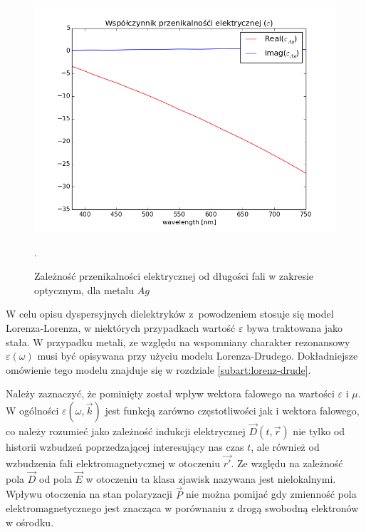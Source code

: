 \begin{figure}[tb]
	\includegraphics[width=\textwidth]{images/agtio2eps.png}
	\label{fig:agtio2eps}
	\caption{Zależność przenikalności elektrycznej od długości fali w zakresie optycznym, dla metalu $Ag$\cite{PhysRevB.6.4370} }.  
\end{figure}
W celu opisu dyspersyjnych dielektryków z~powodzeniem stosuje się model Lorenza-Lorenza, w niektórych przypadkach wartość $\varepsilon$ bywa traktowana jako stała. W przypadku metali, ze względu na wspomniany charakter rezonansowy $\varepsilon(\omega)$  musi być opisywana przy użyciu modelu Lorenza-Drudego. Dokładniejsze omówienie tego modelu znajduje się w rozdziale \ref{subart:lorenz-drude}.

Należy zaznaczyć, że pominięty został wpływ wektora falowego na wartości $\varepsilon$ i $\mu$. W ogólności $\varepsilon(\omega,\vec{k})$ jest funkcją zarówno częstotliwości jak i wektora falowego, co należy rozumieć jako zależność indukcji elektrycznej $\vec{D}(t,\vec{r})$ nie tylko od historii wzbudzeń poprzedzającej interesujący nas czas $t$, ale również od wzbudzenia fali elektromagnetycznej w otoczeniu $\vec{r'}$. Ze względu na zależność pola $\vec{D}$ od pola $\vec{E}$ w otoczeniu ta klasa zjawisk nazywana jest nielokalnymi. Wpływu otoczenia na stan polaryzacji $\vec{P}$ nie można pomijać gdy zmienność pola elektromagnetycznego jest znacząca w porównaniu z drogą swobodną elektronów w ośrodku.



